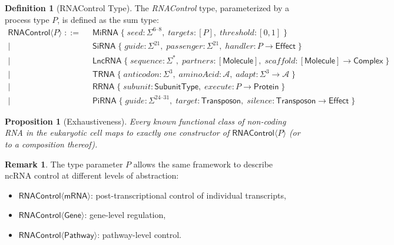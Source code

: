 \documentclass[12pt,a4paper]{article}
\newtheorem{proposition}[theorem]{Proposition}
\theoremstyle{definition}
\newtheorem{definition}[theorem]{Definition}
\newtheorem{remark}[theorem]{Remark}
\newcommand{\RNAType}{\mathsf{RNAControl}}
\begin{document}
\begin{definition}[RNAControl Type]\label{def:rnacontrol}
The \emph{RNAControl} type, parameterized by a process type $P$, is
defined as the sum type:
\begin{align*}
  \RNAType\langle P\rangle \;::=\;
    &\; \mathsf{MiRNA}\;\{\;\mathit{seed} : \Sigma^{6\text{--}8},\;
      \mathit{targets} : [P],\;
      \mathit{threshold} : [0,1]\;\} \\
    \mid\; &\; \mathsf{SiRNA}\;\{\;\mathit{guide} : \Sigma^{21},\;
      \mathit{passenger} : \Sigma^{21},\;
      \mathit{handler} : P \to \mathsf{Effect}\;\} \\
    \mid\; &\; \mathsf{LncRNA}\;\{\;\mathit{sequence} : \Sigma^*,\;
      \mathit{partners} : [\mathsf{Molecule}],\;
      \mathit{scaffold} : [\mathsf{Molecule}] \to \mathsf{Complex}\;\} \\
    \mid\; &\; \mathsf{TRNA}\;\{\;\mathit{anticodon} : \Sigma^3,\;
      \mathit{aminoAcid} : \mathcal{A},\;
      \mathit{adapt} : \Sigma^3 \to \mathcal{A}\;\} \\
    \mid\; &\; \mathsf{RRNA}\;\{\;\mathit{subunit} : \mathsf{SubunitType},\;
      \mathit{execute} : P \to \mathsf{Protein}\;\} \\
    \mid\; &\; \mathsf{PiRNA}\;\{\;\mathit{guide} : \Sigma^{24\text{--}31},\;
      \mathit{target} : \mathsf{Transposon},\;
      \mathit{silence} : \mathsf{Transposon} \to \mathsf{Effect}\;\}
\end{align*}
\end{definition}

\begin{proposition}[Exhaustiveness]
Every known functional class of non-coding RNA in the eukaryotic cell
maps to exactly one constructor of $\RNAType\langle P\rangle$ (or to a
composition thereof).
\end{proposition}

\begin{remark}
The type parameter $P$ allows the same framework to describe
ncRNA control at different levels of abstraction:
\begin{itemize}
  \item $\RNAType\langle\mathsf{mRNA}\rangle$: post-transcriptional
    control of individual transcripts,
  \item $\RNAType\langle\mathsf{Gene}\rangle$: gene-level regulation,
  \item $\RNAType\langle\mathsf{Pathway}\rangle$: pathway-level control.
\end{itemize}
\end{remark}
\end{document}
